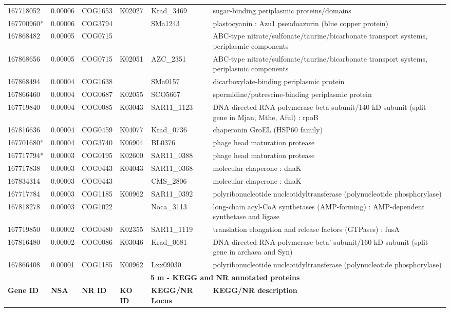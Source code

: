 \begin{landscape}
\begin{longtable}{p{1.6cm}p{1.2cm}p{1.5cm}p{1.5cm}p{2.8cm}p{13.5cm}}
167718052&0.00006&COG1653&K02027&Krad\_3469&sugar-binding periplasmic proteins/domains \\
167700960*&0.00006&COG3794&&SMa1243&plastocyanin :  Azu1 pseudoazurin (blue copper protein) \\
167868482&0.00005&COG0715&&&ABC-type nitrate/sulfonate/taurine/bicarbonate transport systems, periplasmic components \\
167868656&0.00005&COG0715&K02051&AZC\_2351&ABC-type nitrate/sulfonate/taurine/bicarbonate transport systems, periplasmic components \\
167868494&0.00004&COG1638&&SMa0157&dicarboxylate-binding periplasmic protein \\
167866460&0.00004&COG0687&K02055&SCO5667&spermidine/putrescine-binding periplasmic protein \\
167719840&0.00004&COG0085&K03043&SAR11\_1123&DNA-directed RNA polymerase beta subunit/140 kD subunit (split gene in Mjan, Mthe, Aful) : rpoB \\
167816636&0.00004&COG0459&K04077&Krad\_0736&chaperonin GroEL (HSP60 family) \\
167701680*&0.00004&COG3740&K06904&BL0376&phage head maturation protease \\
167717794*&0.00003&COG0195&K02600&SAR11\_0388&phage head maturation protease \\
167717838&0.00003&COG0443&K04043&SAR11\_0368&molecular chaperone : dnaK \\
167834314&0.00003&COG0443&&CMS\_2806&molecular chaperone : dnaK \\
167717784&0.00003&COG1185&K00962&SAR11\_0392&polyribonucleotide nucleotidyltransferase (polynucleotide phosphorylase) \\
167818278&0.00003&COG1022&&Noca\_3113&long-chain acyl-CoA synthetases (AMP-forming) : AMP-dependent synthetase and ligase \\
167719850&0.00002&COG0480&K02355&SAR11\_1119&translation elongation and release factors (GTPases) : fusA \\
167816480&0.00002&COG0086&K03046&Krad\_0681&DNA-directed RNA polymerase beta' subunit/160 kD subunit (split gene in archaea and Syn) \\
167866408&0.00001&COG1185&K00962&Lxx09030&polyribonucleotide nucleotidyltransferase (polynucleotide phosphorylase) \\
\multicolumn{6}{c}{\textbf{ 5 m - KEGG and NR annotated proteins}} \\
\textbf{Gene ID} & \textbf{NSA} & \textbf{NR ID} & \textbf{KO ID} & \textbf{KEGG/NR Locus} & \textbf{KEGG/NR description} \\

\end{longtable}
\end{landscape}
